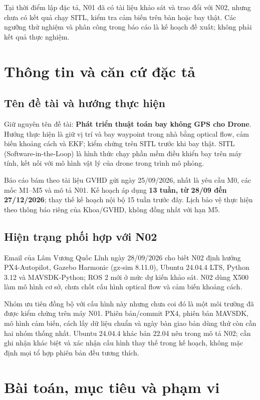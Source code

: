 \documentclass[a4paper,12pt]{article}
\begin{document}
Tại thời điểm lập đặc tả, N01 đã có tài liệu khảo sát và trao đổi với N02, nhưng chưa có kết quả chạy SITL, kiểm tra cảm biến trên bàn hoặc bay thật. Các ngưỡng thử nghiệm và phân công trong báo cáo là kế hoạch đề xuất; không phải kết quả thực nghiệm.

\section{Thông tin và căn cứ đặc tả}
\subsection{Tên đề tài và hướng thực hiện}
Giữ nguyên tên đề tài: \textbf{Phát triển thuật toán bay không GPS cho Drone}. Hướng thực hiện là giữ vị trí và bay waypoint trong nhà bằng optical flow, cảm biến khoảng cách và EKF; kiểm chứng trên SITL trước khi bay thật. SITL (Software-in-the-Loop) là hình thức chạy phần mềm điều khiển bay trên máy tính, kết nối với mô hình vật lý của drone trong trình mô phỏng.

Báo cáo bám theo tài liệu GVHD gửi ngày 25/09/2026, nhất là yêu cầu M0, các mốc M1–M5 và mô tả N01\cite{assignment}. Kế hoạch áp dụng \textbf{13 tuần, từ 28/09 đến 27/12/2026}; thay thế kế hoạch nội bộ 15 tuần trước đây. Lịch bảo vệ thực hiện theo thông báo riêng của Khoa/GVHD, không đồng nhất với hạn M5.

\subsection{Hiện trạng phối hợp với N02}
Email của Lâm Vương Quốc Lĩnh ngày 28/09/2026 cho biết N02 định hướng PX4-Autopilot, Gazebo Harmonic (gz-sim 8.11.0), Ubuntu 24.04.4 LTS, Python 3.12 và MAVSDK-Python; ROS 2 mới ở mức dự kiến khảo sát. N02 dùng X500 làm mô hình cơ sở, chưa chốt cấu hình optical flow và cảm biến khoảng cách\cite{n02mail}.

Nhóm ưu tiên đồng bộ với cấu hình này nhưng chưa coi đó là một môi trường đã được kiểm chứng trên máy N01. Phiên bản/commit PX4, phiên bản MAVSDK, mô hình cảm biến, cách lấy dữ liệu chuẩn và ngày bàn giao bản dùng thử còn cần hai nhóm thống nhất. Ubuntu 24.04.4 khác bản 22.04 nêu trong mô tả N02; cần ghi nhận khác biệt và xác nhận cấu hình thay thế trong kế hoạch, không mặc định mọi tổ hợp phiên bản đều tương thích.

\section{Bài toán, mục tiêu và phạm vi}
\end{document}
